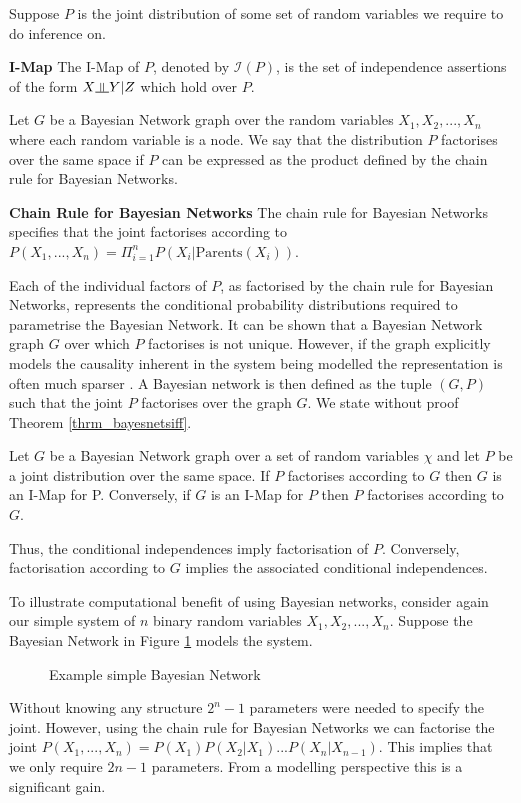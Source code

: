 Suppose $P$ is the joint distribution of some set of random variables we require to do inference on.
\begin{defn}
\textbf{I-Map} The I-Map of $P$, denoted by $\mathcal{I}(P)$, is the set of independence assertions of the form $X \indep Y | Z$ which hold over $P$.
\end{defn} 
Let $G$ be a Bayesian Network graph over the random variables $X_1, X_2,...,X_n$ where each random variable is a node. We say that the distribution $P$ factorises over the same space if $P$ can be expressed as the product defined by the chain rule for Bayesian Networks.
\begin{defn}
\textbf{Chain Rule for Bayesian Networks} The chain rule for Bayesian Networks specifies that the joint factorises according to $P(X_1,...,X_n) = \Pi_{i=1}^n P(X_i | \text{Parents}(X_i))$.
\end{defn}
Each of the individual factors of $P$, as factorised by the chain rule for Bayesian Networks, represents the conditional probability distributions required to parametrise the Bayesian Network. It can be shown that a Bayesian Network graph $G$ over which $P$ factorises is not unique. However, if the graph explicitly models the causality inherent in the system being modelled the representation is often much sparser \cite{koller}. A Bayesian network is then defined as the tuple $(G, P)$ such that the joint $P$ factorises over the graph $G$. We state without proof Theorem \ref{thrm_bayesnetsiff}. 
\begin{thrm}
Let $G$ be a Bayesian Network graph over a set of random variables $\chi$ and let $P$ be a joint distribution over the same space. If $P$ factorises according to $G$ then $G$ is an I-Map for P. Conversely, if $G$ is an I-Map for $P$ then $P$ factorises according to $G$.
\label{thrm_bayesnetsiff}
\end{thrm}
Thus, the conditional independences imply factorisation of $P$. Conversely, factorisation according to $G$ implies the associated conditional independences.

To illustrate computational benefit of using Bayesian networks, consider again our simple system of $n$ binary random variables $X_1,X_2,...,X_n$. Suppose the Bayesian Network in Figure \ref{fig_bnet} models the system.
\begin{figure}[H] 
\centering
{}
\caption{Example simple Bayesian Network}
\label{fig_bnet}
\end{figure}
Without knowing any structure $2^{n}-1$ parameters were needed to specify the joint. However, using the chain rule for Bayesian Networks we can factorise the joint $P(X_1,...,X_n) = P(X_1)P(X_2|X_1)...P(X_n|X_{n-1})$. This implies that we only require $2n-1$ parameters. From a modelling perspective this is a significant gain.

